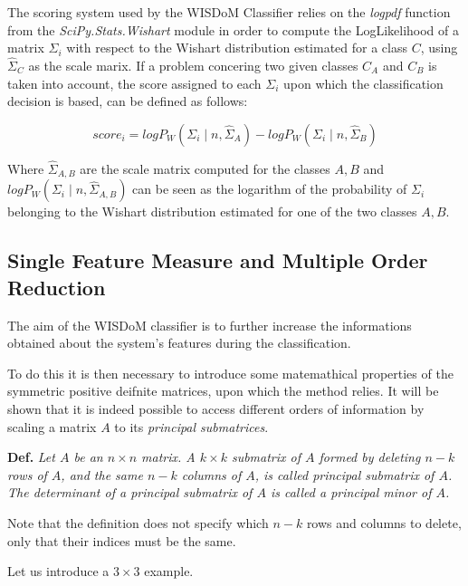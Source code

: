 \documentclass[12pt,openright,twoside,a4paper]{book}
\begin{document}
The scoring system used by the WISDoM Classifier relies on the \textit{logpdf} function from the \textit{SciPy.Stats.Wishart} module in order to compute the LogLikelihood of a matrix $\Sigma_i$ with respect to the Wishart distribution estimated for a class $C$, using $\hat{\Sigma}_C$ as the scale marix.
If a problem concering two given classes $C_A$ and $C_B$ is taken into account, the score assigned to each $\Sigma_i$ upon which the classification decision is based, can be defined as follows:

\begin{equation}
score_{i}= logP_{W}(\Sigma_{i}\mid n, \hat{\Sigma}_{A})-logP_{W}(\Sigma_{i}\mid n,\hat{\Sigma}_{B})
\label{pdf-score}
\end{equation}

Where $\hat{\Sigma}_{A,B}$ are the scale matrix computed for the classes $A,B$ and $ logP_{W}(\Sigma_{i}\mid n, \hat{\Sigma}_{A,B})$ can be seen as the logarithm of the probability of $\Sigma_i$ belonging to the Wishart distribution estimated for one of the two classes $A,B$.

\subsection{Single Feature Measure and Multiple Order Reduction}

The aim of the WISDoM classifier is to further increase the informations obtained about the system's features during the classification.

To do this it is then necessary to introduce some matemathical properties of the symmetric positive deifnite matrices, upon which the method relies.
It will be shown that it is indeed possible to access different orders of information by scaling a matrix $A$ to its \textit{principal submatrices}.

\vspace{5mm}

\textbf{Def.} \textit{Let $A$ be an $n \times n$ matrix. A $k \times k$ submatrix of $A$ formed by deleting $n-k$ rows of $A$, and the same $n-k$ columns of $A$, is called principal submatrix of $A$. The determinant of a principal submatrix of $A$ is called a principal minor of $A$.}

\vspace{5mm}

Note that the definition does not specify which $n-k$ rows and columns to delete, only that their indices must be the same.

Let us introduce a $3 \times 3$ example.
\end{document}
